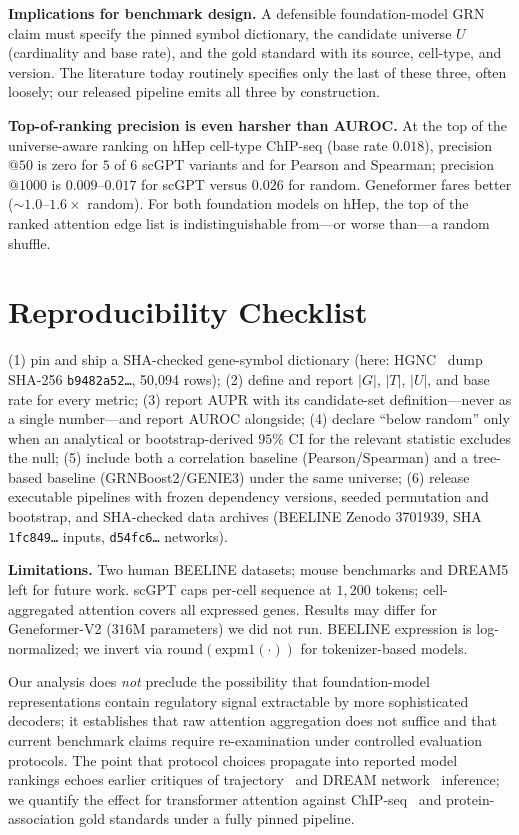 \documentclass[sigconf, nonacm]{acmart}
\begin{document}
\textbf{Implications for benchmark design.}
A defensible foundation-model GRN claim must specify the pinned
symbol dictionary, the candidate universe $U$ (cardinality and base
rate), and the gold standard with its source, cell-type, and version.
The literature today routinely specifies only the last of these
three, often loosely; our released pipeline emits all three by
construction.

\textbf{Top-of-ranking precision is even harsher than AUROC.}
At the top of the universe-aware ranking on hHep cell-type ChIP-seq
(base rate $0.018$), precision$@50$ is zero for $5$ of $6$ scGPT
variants and for Pearson and Spearman; precision$@1000$ is
$0.009$--$0.017$ for scGPT versus $0.026$ for random. Geneformer
fares better ($\sim$$1.0$--$1.6\times$ random). For both foundation
models on hHep, the top of the ranked attention edge list is
indistinguishable from---or worse than---a random shuffle.

\section{Reproducibility Checklist}

(1) pin and ship a SHA-checked gene-symbol dictionary
(here: HGNC~\cite{tweedie2021hgnc} dump SHA-256
\texttt{b9482a52\ldots}, 50{,}094 rows);
(2) define and report $|G|$, $|T|$, $|U|$, and base rate for every
metric;
(3) report AUPR with its candidate-set definition---never as a single
number---and report AUROC alongside;
(4) declare ``below random'' only when an analytical or
bootstrap-derived $95\%$ CI for the relevant statistic excludes the
null;
(5) include both a correlation baseline (Pearson/Spearman) and a
tree-based baseline (GRNBoost2/GENIE3) under the same universe;
(6) release executable pipelines with frozen dependency versions,
seeded permutation and bootstrap, and SHA-checked data archives
(BEELINE Zenodo 3701939, SHA \texttt{1fc849\ldots} inputs,
\texttt{d54fc6\ldots} networks).

\textbf{Limitations.} Two human BEELINE datasets; mouse benchmarks
and DREAM5 left for future work. scGPT caps per-cell sequence at
$1{,}200$ tokens; cell-aggregated attention covers all expressed
genes. Results may differ for Geneformer-V2 ($316$M parameters) we
did not run. BEELINE expression is log-normalized; we invert via
$\mathrm{round}(\mathrm{expm1}(\cdot))$ for tokenizer-based models.

Our analysis does \emph{not} preclude the possibility that
foundation-model representations contain regulatory signal extractable
by more sophisticated decoders; it establishes that raw attention
aggregation does not suffice and that current benchmark claims require
re-examination under controlled evaluation protocols. The point that
protocol choices propagate into reported model rankings echoes earlier
critiques of trajectory~\cite{saelens2019} and DREAM
network~\cite{marbach2012} inference; we quantify the effect for
transformer attention against ChIP-seq~\cite{encode2018,pratapa2020}
and protein-association gold standards under a fully pinned pipeline.
\end{document}
